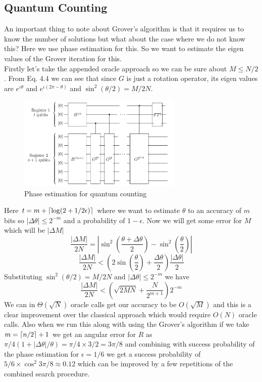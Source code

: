 \documentclass{report}
\DeclarePairedDelimiter{\ceil}{\lceil}{\rceil}
\begin{document}
\subsection{Quantum Counting}
An important thing to note about Grover's algorithm is that it requires us to know the number of solutions but what about the case where we do not know this? Here we use phase estimation for this. So we want to estimate the eigen values of the Grover iteration for this.\\
Firstly let's take the appended oracle approach so we can be sure about $M \leq N/2$. From Eq. 4.4 we can see that since $G$ is just a rotation operator, its eigen values are $e^{\iota\theta}$ and $e^{\iota(2\pi-\theta)}$ and $\sin^2(\theta/2) = M/2N$.
\begin{figure}[ht]
    \centering
    \includegraphics[width = 0.7\textwidth]{images/grover phase estimation.png}
    \caption{Phase estimation for quantum counting}
\end{figure}
Here $t = m + \ceil{\log(2 + 1/2\epsilon)}$ where we want to estimate $\theta$ to an accuracy of $m$ bits so $|\Delta{\theta}| \leq 2^{-m}$ and a probability of $1-\epsilon$. Now we will get some error for $M$ which will be $|\Delta{M}|$
\begin{equation}\dfrac{|\Delta{M}|}{2N} = \left|\sin^2\left(\dfrac{\theta + \Delta{\theta}}{2}\right) - \sin^2\left(\dfrac{\theta}{2}\right)\right|\end{equation}
\begin{equation}\dfrac{|\Delta{M}|}{2N} < \left(2\sin\left(\dfrac{\theta}{2}\right) + \dfrac{\Delta\theta}{2}\right)\dfrac{|\Delta\theta|}{2}\end{equation}
Substituting $\sin^2(\theta/2) = M/2N$ and $|\Delta{\theta}| \leq 2^{-m}$ we have
\begin{equation}\dfrac{|\Delta{M}|}{2N} < \left(\sqrt{2MN} + \dfrac{N}{2^{m+1}}\right)2^{-m}\end{equation}
We can in $\Theta(\sqrt{N})$ oracle calls get our accuracy to be $O(\sqrt{M})$ and this is a clear improvement over the classical approach which would require $O(N)$ oracle calls. Also when we run this along with using the Grover's algorithm if we take $m = \ceil{n/2} + 1$ we get an angular error for $R$ as $\pi/4(1+ |\Delta\theta|/\theta) = \pi/4 \times 3/2 = 3\pi/8$ and combining with success probability of the phase estimation for $\epsilon = 1/6$ we get a success probability of $5/6 \times \cos^2{3\pi/8} \approx 0.12$ which can be improved by a few repetitions of the combined search procedure.
\end{document}
